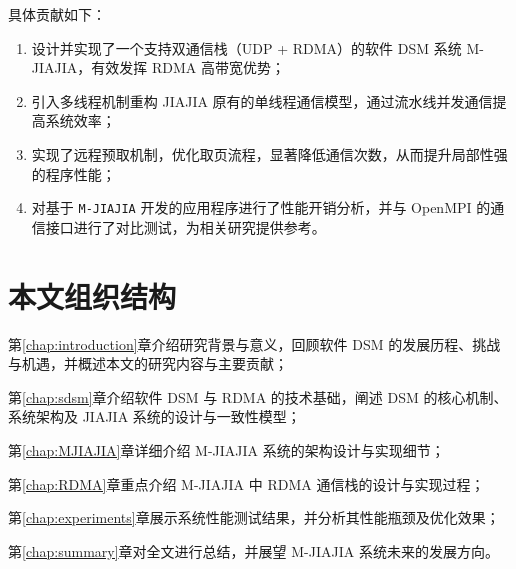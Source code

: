 {  具体贡献如下：
  \begin{enumerate}[leftmargin=1em, align=left]
    \item 设计并实现了一个支持双通信栈（UDP + RDMA）的软件 DSM 系统 M-JIAJIA，有效发挥 RDMA 高带宽优势；
    \item 引入多线程机制重构 JIAJIA 原有的单线程通信模型，通过流水线并发通信提高系统效率；
    \item 实现了远程预取机制，优化取页流程，显著降低通信次数，从而提升局部性强的程序性能；
    \item 对基于 \texttt{M-JIAJIA} 开发的应用程序进行了性能开销分析，并与 OpenMPI 的通信接口进行了对比测试，为相关研究提供参考。
  \end{enumerate}

  \section{本文组织结构}
  第\ref{chap:introduction}章介绍研究背景与意义，回顾软件 DSM 的发展历程、挑战与机遇，并概述本文的研究内容与主要贡献；

  第\ref{chap:sdsm}章介绍软件 DSM 与 RDMA 的技术基础，阐述 DSM 的核心机制、系统架构及 JIAJIA 系统的设计与一致性模型；

  第\ref{chap:MJIAJIA}章详细介绍 M-JIAJIA 系统的架构设计与实现细节；

  第\ref{chap:RDMA}章重点介绍 M-JIAJIA 中 RDMA 通信栈的设计与实现过程；

  第\ref{chap:experiments}章展示系统性能测试结果，并分析其性能瓶颈及优化效果；

  第\ref{chap:summary}章对全文进行总结，并展望 M-JIAJIA 系统未来的发展方向。
}